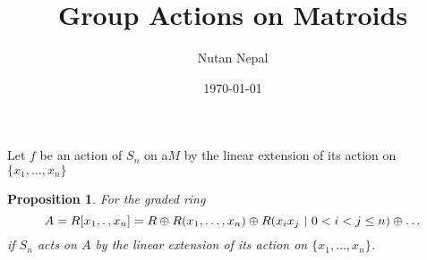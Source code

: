 \documentclass[12pt]{article}
\title{Group Actions on Matroids}
\author{Nutan Nepal}
\date{\today}
\newtheorem{proposition}{Proposition}[section]
\begin{document}
\maketitle

Let $f$ be an action of $S_n$ on a$M$ by the linear extension of
its action on $\{x_1,\ldots,x_n\}$
\setcounter{section}{1}
\setcounter{theorem}{1}


\begin{proposition}
For the graded ring $$A=R[x_1,\ldotp,x_n] = R \oplus R(x_1,\ldots,x_n)
\oplus R(x_ix_j\ |\ 0<i<j\leq n) \oplus \ldots$$
if $S_n$ acts on $A$ by the linear extension of its action on $\{x_1,\ldots,
x_n\}$.
\end{proposition}
\end{document}
